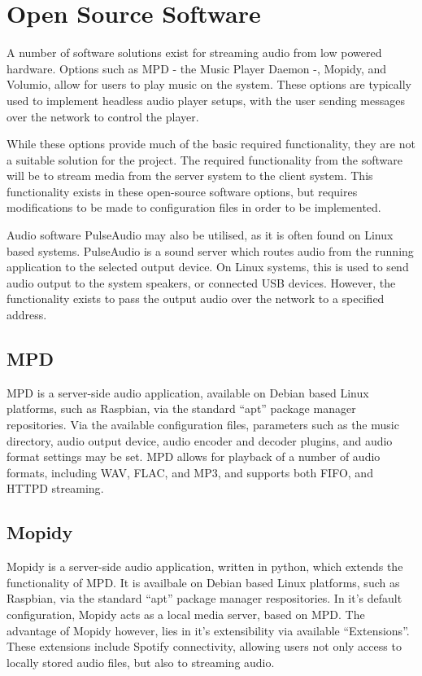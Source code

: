 \documentclass[11pt,a4paper,headinclude=false,footinclude=false]{scrreprt}
\begin{document}
\section{Open Source Software}\label{open-source-software}

A number of software solutions exist for streaming audio from low
powered hardware. Options such as MPD - the Music Player Daemon -,
Mopidy, and Volumio, allow for users to play music on the system. These
options are typically used to implement headless audio player setups,
with the user sending messages over the network to control the player.

While these options provide much of the basic required functionality,
they are not a suitable solution for the project. The required
functionality from the software will be to stream media from the server
system to the client system. This functionality exists in these
open-source software options, but requires modifications to be made to
configuration files in order to be implemented.

Audio software PulseAudio may also be utilised, as it is often found on
Linux based systems. PulseAudio is a sound server which routes audio
from the running application to the selected output device. On Linux
systems, this is used to send audio output to the system speakers, or
connected USB devices. However, the functionality exists to pass the
output audio over the network to a specified address\cite{Pulse14}.

\subsection{MPD}\label{mpd}

MPD is a server-side audio application, available on Debian based Linux
platforms, such as Raspbian, via the standard ``apt'' package manager
repositories. Via the available configuration files, parameters such as
the music directory, audio output device, audio encoder and decoder
plugins, and audio format settings may be set. MPD allows for playback
of a number of audio formats, including WAV, FLAC, and MP3, and supports
both FIFO, and HTTPD streaming\cite{MPD18}.

\subsection{Mopidy}\label{mopidy}

Mopidy is a server-side audio application, written in python, which
extends the functionality of MPD. It is availbale on Debian based Linux
platforms, such as Raspbian, via the standard ``apt'' package manager
respositories. In it's default configuration, Mopidy acts as a local
media server, based on MPD. The advantage of Mopidy however, lies in
it's extensibility via available ``Extensions''. These extensions
include Spotify connectivity, allowing users not only access to locally
stored audio files, but also to streaming audio.
\end{document}
